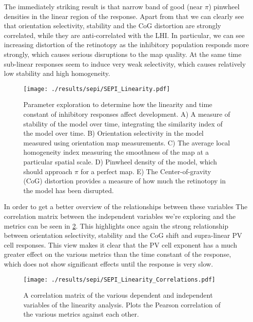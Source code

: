 The immediately striking result is that narrow band of good (near
$\pi$) pinwheel densities in the linear region of the response. Apart
from that we can clearly see that orientation selectivity, stability
and the CoG distortion are strongly correlated, while they are
anti-correlated with the LHI. In particular, we can see increasing
distortion of the retinotopy as the inhibitory population responds
more strongly, which causes serious disruptions to the map quality. At
the same time sub-linear responses seem to induce very weak
selectivity, which causes relatively low stability and high
homogeneity.

\begin{figure}
	\centering
        \texttt{[image: ./results/sepi/SEPI\_Linearity.pdf]}
	\caption{Parameter exploration to determine how the linearity and
      time constant of inhibitory responses affect development. A) A
      measure of stability of the model over time, integrating the
      similarity index of the model over time. B) Orientation
      selectivity in the model measured using orientation map
      measurements. C) The average local homogeneity index measuring
      the smoothness of the map at a particular spatial scale. D)
      Pinwheel density of the model, which should approach $\pi$ for a
      perfect map. E) The Center-of-gravity (CoG) distortion provides
      a measure of how much the retinotopy in the model has been
      disrupted.}
	\label{SEPILinearity}
\end{figure}

In order to get a better overview of the relationships between these
variables The correlation matrix between the independent variables
we're exploring and the metrics can be seen in
\ref{SEPILinearityCorr}. This highlights once again the strong
relationship between orientation selectivity, stability and the CoG
shift and supra-linear PV cell responses. This view makes it clear
that the PV cell exponent has a much greater effect on the various
metrics than the time constant of the response, which does not show
significant effects until the response is very slow.

\begin{figure}
	\centering
        \texttt{[image: ./results/sepi/SEPI\_Linearity\_Correlations.pdf]}
	\caption{A correlation matrix of the various dependent and
      independent variables of the linearity analysis. Plots the
      Pearson correlation of the various metrics against each other.}
	\label{SEPILinearityCorr}
\end{figure}

